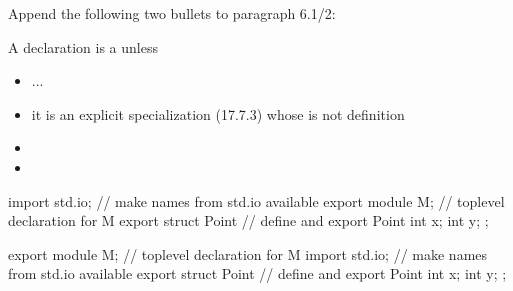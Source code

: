 \noindent
Append the following two bullets to paragraph 6.1/2:
\begin{std.txt}
  \resetalinea[1]
  \alinea
  A declaration is a  unless
  \begin{itemize}
    \item ...
    \item it is an explicit specialization (17.7.3) whose 
    is not definition\added{,}
    \color{addclr}
    \item {}
    \item {} 
  \end{itemize}
  \color{addclr}
\enterexample
\begin{before}\color{addclr}
\begin{codeblock}
    import std.io;                  // make names from std.io available
    export module M;                // toplevel declaration for M
    export struct Point {           // define and export Point
      int x;
      int y;
    };
\end{codeblock}
\end{before}\begin{after}\color{addclr}
\begin{codeblock}
    export module M;                // toplevel declaration for M
    import std.io;                  // make names from std.io available
    export struct Point {           // define and export Point
      int x;
      int y;
    };
\end{codeblock}
\end{after}
\exitexample
\end{std.txt}

